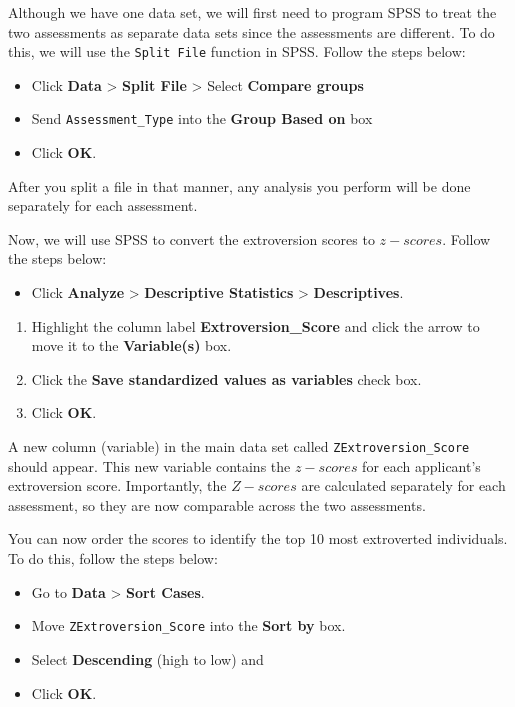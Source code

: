 \documentclass[
  letterpaper,
  DIV=11,
  numbers=noendperiod]{scrartcl}
\providecommand{\tightlist}{%
  \setlength{\itemsep}{0pt}\setlength{\parskip}{0pt}}\usepackage{longtable,booktabs,array}
\begin{document}
Although we have one data set, we will first need to program SPSS to
treat the two assessments as separate data sets since the assessments
are different. To do this, we will use the \texttt{Split\ File} function
in SPSS. Follow the steps below:

\begin{itemize}
\tightlist
\item
  Click \textbf{Data} \textgreater{} \textbf{Split File} \textgreater{}
  Select \textbf{Compare groups}
\item
  Send \texttt{Assessment\_Type} into the \textbf{Group Based on} box
\item
  Click \textbf{OK}.
\end{itemize}

After you split a file in that manner, any analysis you perform will be
done separately for each assessment.

Now, we will use SPSS to convert the extroversion scores to
\(z-scores\). Follow the steps below:

\begin{itemize}
\tightlist
\item
  Click \textbf{Analyze} \textgreater{} \textbf{Descriptive Statistics}
  \textgreater{} \textbf{Descriptives}.
\end{itemize}

\begin{enumerate}
\def\labelenumi{\arabic{enumi}.}
\setcounter{enumi}{2}
\tightlist
\item
  Highlight the column label \textbf{Extroversion\_Score} and click the
  arrow to move it to the \textbf{Variable(s)} box.
\item
  Click the \textbf{Save standardized values as variables} check box.
\item
  Click \textbf{OK}.
\end{enumerate}

A new column (variable) in the main data set called
\texttt{ZExtroversion\_Score} should appear. This new variable contains
the \(z-scores\) for each applicant's extroversion score. Importantly,
the \(Z-scores\) are calculated separately for each assessment, so they
are now comparable across the two assessments.

You can now order the scores to identify the top 10 most extroverted
individuals. To do this, follow the steps below:

\begin{itemize}
\tightlist
\item
  Go to \textbf{Data} \textgreater{} \textbf{Sort Cases}.
\item
  Move \texttt{ZExtroversion\_Score} into the \textbf{Sort by} box.
\item
  Select \textbf{Descending} (high to low) and
\item
  Click \textbf{OK}.
\end{itemize}
\end{document}
